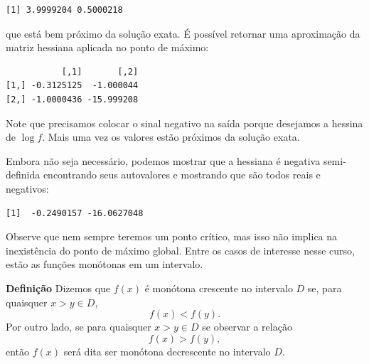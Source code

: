 \documentclass[
  letterpaper,
  DIV=11,
  numbers=noendperiod]{scrartcl}
\newenvironment{Shaded}{\begin{snugshade}}{\end{snugshade}}
\newcommand{\AttributeTok}[1]{\textcolor[rgb]{0.40,0.45,0.13}{#1}}
\newcommand{\DecValTok}[1]{\textcolor[rgb]{0.68,0.00,0.00}{#1}}
\newcommand{\FunctionTok}[1]{\textcolor[rgb]{0.28,0.35,0.67}{#1}}
\newcommand{\NormalTok}[1]{\textcolor[rgb]{0.00,0.23,0.31}{#1}}
\newcommand{\OtherTok}[1]{\textcolor[rgb]{0.00,0.23,0.31}{#1}}
\newcommand{\SpecialCharTok}[1]{\textcolor[rgb]{0.37,0.37,0.37}{#1}}
\begin{document}
\begin{verbatim}
[1] 3.9999204 0.5000218
\end{verbatim}

que está bem próximo da solução exata. É possível retornar uma
aproximação da matriz hessiana aplicada no ponto de máximo:

\begin{Shaded}
\end{Shaded}

\begin{verbatim}
           [,1]       [,2]
[1,] -0.3125125  -1.000044
[2,] -1.0000436 -15.999208
\end{verbatim}

Note que precisamos colocar o sinal negativo na saída porque desejamos a
hessina de \(\log f\). Mais uma vez os valores estão próximos da solução
exata.

Embora não seja necessário, podemos mostrar que a hessiana é negativa
semi-definida encontrando seus autovalores e mostrando que são todos
reais e negativos:

\begin{Shaded}
\end{Shaded}

\begin{verbatim}
[1]  -0.2490157 -16.0627048
\end{verbatim}

Observe que nem sempre teremos um ponto crítico, mas isso não implica na
inexistência do ponto de máximo global. Entre os casos de interesse
nesse curso, estão as funções monótonas em um intervalo.

\textbf{Definição} Dizemos que \(f(x)\) é monótona crescente no
intervalo \(D\) se, para quaisquer \(x>y\in D\), \[f(x)<f(y).\] Por
outro lado, se para quaisquer \(x>y\in D\) se observar a relação
\[f(x)>f(y),\] então \(f(x)\) será dita ser monótona decrescente no
intervalo \(D\).
\end{document}
